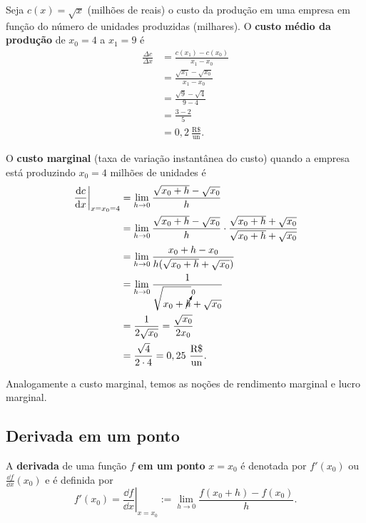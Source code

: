 \begin{ex}
  Seja $c(x) = \sqrt{x}$ (milhões de reais) o custo da produção em uma empresa em função do número de unidades produzidas (milhares). O {\bf custo médio da produção} de $x_0=4$ a $x_1=9$ é
  \begin{align}
    \frac{\Delta c}{\Delta x} &= \frac{c(x_1)-c(x_0)}{x_1-x_0}\\
                              &= \frac{\sqrt{x_1}-\sqrt{x_0}}{x_1-x_0}\\
                              &= \frac{\sqrt{9}-\sqrt{4}}{9-4}\\
                              &= \frac{3-2}{5} \\
                              &= 0,2~\frac{\text{R\$}}{\text{un}}.
  \end{align}

  O {\bf custo marginal} (taxa de variação instantânea do custo) quando a empresa está produzindo $x_0=4$ milhões de unidades é
  \begin{align}
    \left.\frac{\mathrm{d} c}{\mathrm{d} x}\right|_{x=x_0=4} &= \lim_{h\to 0} \frac{\sqrt{x_0+h}-\sqrt{x_0}}{h}\\
                                               &= \lim_{h\to 0} \frac{\sqrt{x_0+h}-\sqrt{x_0}}{h}\cdot \frac{\sqrt{x_0+h}+\sqrt{x_0}}{\sqrt{x_0+h}+\sqrt{x_0}}\\
                                               &= \lim_{h\to 0} \frac{x_0+h-x_0}{h(\sqrt{x_0+h}+\sqrt{x_0})}\\
                                               &= \lim_{h\to 0} \frac{1}{\sqrt{x_0+\cancelto{0}{h}}+\sqrt{x_0}}\\
                                               &= \frac{1}{2\sqrt{x_0}} = \frac{\sqrt{x_0}}{2x_0}\\
                                               &= \frac{\sqrt{4}}{2\cdot 4} = 0,25~\frac{\text{R\$}}{\text{un}}.
  \end{align}
\end{ex}

\begin{obs}
  Analogamente a custo marginal, temos as noções de rendimento marginal e lucro marginal.
\end{obs}

\subsection{Derivada em um ponto}

A {\bf derivada} de uma função $f$ {\bf em um ponto} $x=x_0$ é denotada por $f'(x_0)$ ou $\displaystyle \frac{\dd f}{\dd x}(x_0)$ e é definida por
\begin{equation}
  f'(x_0) = \left.\frac{\dd f}{\dd x}\right|_{x=x_0} := \lim_{h\to 0} \frac{f(x_0+h)-f(x_0)}{h}.
\end{equation}

